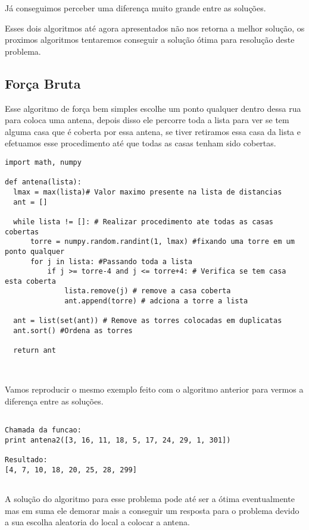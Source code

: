 \documentclass[11pt]{article}
\begin{document}
Já conseguimos perceber uma diferença muito grande entre as soluções.

Esses dois algoritmos até agora apresentados não nos retorna a melhor solução, os proximos algoritmos tentaremos conseguir a
solução ótima para resolução deste problema.

\subsection{Força Bruta}

\label{sec-3-2}

Esse algoritmo de força bem simples escolhe um ponto qualquer dentro dessa rua para coloca uma antena, depois disso ele percorre 
toda a lista para ver se tem alguma casa que é coberta por essa antena, se tiver retiramos essa casa da lista e efetuamos esse 
procedimento até que todas as casas tenham sido cobertas.

\begin{verbatim}
import math, numpy

def antena(lista):
  lmax = max(lista)# Valor maximo presente na lista de distancias
  ant = []
  
  while lista != []: # Realizar procedimento ate todas as casas cobertas
      torre = numpy.random.randint(1, lmax) #fixando uma torre em um ponto qualquer
      for j in lista: #Passando toda a lista
          if j >= torre-4 and j <= torre+4: # Verifica se tem casa esta coberta
              lista.remove(j) # remove a casa coberta
              ant.append(torre) # adciona a torre a lista
  
  ant = list(set(ant)) # Remove as torres colocadas em duplicatas
  ant.sort() #Ordena as torres

  return ant
 
 
\end{verbatim}

Vamos reproducir o mesmo exemplo feito com o algoritmo anterior para vermos a diferença entre as soluções.

\begin{verbatim}

Chamada da funcao:
print antena2([3, 16, 11, 18, 5, 17, 24, 29, 1, 301])

Resultado:
[4, 7, 10, 18, 20, 25, 28, 299]
 
\end{verbatim}


A solução do algoritmo para esse problema pode até ser a ótima eventualmente mas em suma ele demorar mais a conseguir um resposta
para o problema devido a sua escolha aleatoria do local a colocar a antena. 
\end{document}
